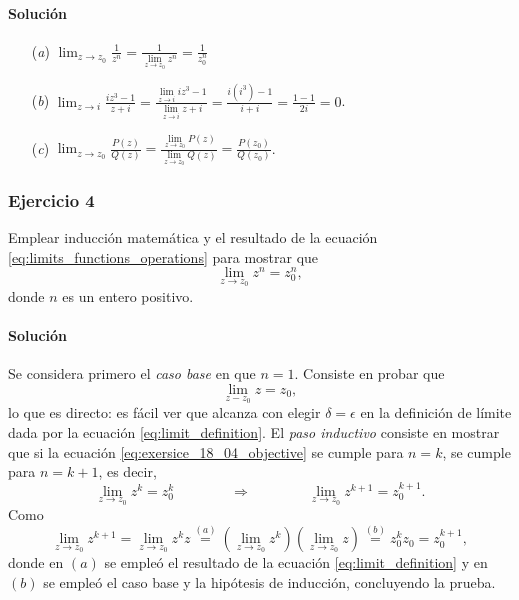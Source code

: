 \documentclass[a4paper]{report}
\begin{document}
\paragraph{Solución} 

\begin{enumerate}
 \item[(\textit{a})] 
 \(\displaystyle\lim_{z\to z_0}\frac{1}{z^n}=\frac{1}{\lim\limits_{z\to z_0}z^n}=\frac{1}{z_0^n}\)
 \item[(\textit{b})] 
 \(\displaystyle\lim_{z\to i}\frac{iz^3-1}{z+i}=\frac{\lim\limits_{z\to i}iz^3-1}{\lim\limits_{z\to i}z+i}=\frac{i(i^3)-1}{i+i}=\frac{1-1}{2i}=0\).
 \item[(\textit{c})]
 \(\displaystyle\lim_{z\to z_0}\frac{P(z)}{Q(z)}=\frac{\lim\limits_{z\to z_0}P(z)}{\lim\limits_{z\to z_0}Q(z)}=\frac{P(z_0)}{Q(z_0)}\).
\end{enumerate}

\subsubsection{Ejercicio 4}

Emplear inducción matemática y el resultado de la ecuación \ref{eq:limits_functions_operations} para mostrar que
\begin{equation}\label{eq:exersice_18_04_objective}
 \lim_{z\to z_0}z^n=z_0^n,
\end{equation}
donde \(n\) es un entero positivo.

\paragraph{Solución} Se considera primero el \emph{caso base} en que \(n=1\). Consiste en probar que 
\[
 \lim_{z-z_0}z=z_0,
\]
lo que es directo: es fácil ver que alcanza con elegir \(\delta=\epsilon\) en la definición de límite dada por la ecuación \ref{eq:limit_definition}. El \emph{paso inductivo} consiste en mostrar que si la ecuación \ref{eq:exersice_18_04_objective} se cumple para \(n=k\), se cumple para \(n=k+1\), es decir,
\[
 \lim_{z\to z_0}z^k=z_0^k
 \qquad\qquad\Rightarrow\qquad\qquad
 \lim_{z\to z_0}z^{k+1}=z_0^{k+1}.
\] 
Como
\[
 \lim_{z\to z_0}z^{k+1}=\lim_{z\to z_0}z^kz\overset{(a)}{=}\left(\lim_{z\to z_0}z^k\right)\left(\lim_{z\to z_0}z\right)\overset{(b)}{=}z_0^kz_0=z_0^{k+1},
\]
donde en \((a)\) se empleó el resultado de la ecuación \ref{eq:limit_definition} y en \((b)\) se empleó el caso base y la hipótesis de inducción, concluyendo la prueba.
\end{document}
